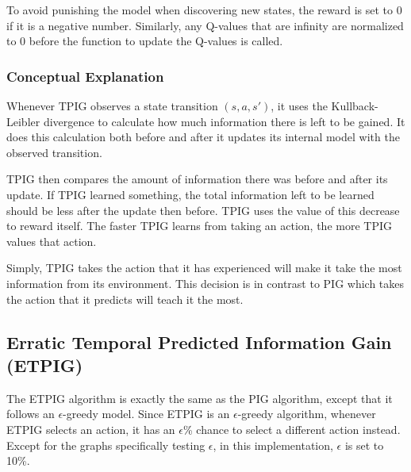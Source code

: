 \documentclass[12pt]{thesis}
\begin{document}
To avoid punishing the model when discovering new states, the reward is set to 0 if it is a negative number. Similarly, any Q-values that are infinity are normalized to 0 before the function to update the Q-values is called.

\subsubsection{Conceptual Explanation}
Whenever TPIG observes a state transition $(s,a,s')$, it uses the Kullback-Leibler divergence to calculate how much information there is left to be gained. It does this calculation both before and after it updates its internal model with the observed transition.

TPIG then compares the amount of information there was before and after its update. If TPIG learned something, the total information left to be learned should be less after the update then before. TPIG uses the value of this decrease to reward itself. The faster TPIG learns from taking an action, the more TPIG values that action.

Simply, TPIG takes the action that it has experienced will make it take the most information from its environment. This decision is in contrast to PIG which takes the action that it predicts will teach it the most.

\subsection{Erratic Temporal Predicted Information Gain (ETPIG)}
The ETPIG algorithm is exactly the same as the PIG algorithm, except that it follows an $\epsilon$-greedy model. Since ETPIG is an $\epsilon$-greedy algorithm, whenever ETPIG selects an action, it has an $\epsilon$\% chance to select a different action instead. Except for the graphs specifically testing $\epsilon$, in this implementation, $\epsilon$ is set to 10\%.
\end{document}
